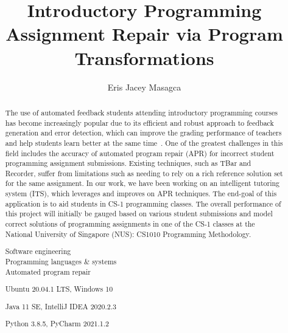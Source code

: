 \documentclass[fyp,12pt]{socreport}
\newcommand{\itab}[1]{\hspace{0em}\rlap{#1}}
\newcommand{\tab}[1]{\hspace{.11\textwidth}\rlap{#1}}
\begin{document}

\title{Introductory Programming Assignment Repair via Program Transformations}
\author{Eris Jacey Masagca}
\deliverables{
    \item \itab{Report:} \tab{1 Volume}
}
\maketitle

\begin{abstract}

The use of automated feedback students attending introductory programming courses has become
increasingly popular due to its efficient and robust approach to feedback generation and error
detection, which can improve the grading performance of teachers and help students learn better
at the same time~\cite{haldeman2021automated}.
One of the greatest challenges in this field includes the accuracy of automated program repair (APR)
for incorrect student programming assignment submissions.
Existing techniques, such as TBar and Recorder, suffer from limitations such as needing to rely on
a rich reference solution set for the same assignment.
In our work, we have been working on an intelligent tutoring system (ITS), which leverages and
improves on APR techniques.
The end-goal of this application is to aid students in CS-1 programming classes.
The overall performance of this project will initially be gauged based on various student submissions
and model correct solutions of programming assignments in one of the CS-1 classes at the National
University of Singapore (NUS): CS1010 Programming Methodology.

\begin{descriptors} %
    \item \itab{TODO}	\tab{TODO}
\end{descriptors}
\begin{keywords}
    Software engineering \\
    Programming languages \& systems \\
    Automated program repair
\end{keywords}

\begin{implement}
    \item{Ubuntu 20.04.1 LTS, Windows 10}
    \item{Java 11 SE, IntelliJ IDEA 2020.2.3}
    \item{Python 3.8.5, PyCharm 2021.1.2}
\end{implement}

\end{abstract}
\end{document}
